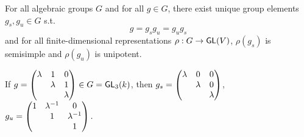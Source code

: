 \begin{theorem}[Goal]
For all algebraic groups $G$ and for all $g \in G$, there exist unique group elements $g_s, g_u \in G$ s.t.
\[g = g_s g_u = g_ug_s\]
and
for all finite-dimensional representations  $\rho : G \overset{}{\rightarrow} \textsf{GL}(V)$, $\rho(g_s)$ is semisimple and $\rho(g_u)$ is unipotent.
\end{theorem}

\begin{example}
If	$g = \left(\begin{matrix}
	\lambda & 1 & 0 \\
	& \lambda & 1 \\
	& & \lambda
	\end{matrix}\right) \in G = \textsf{GL}_3(k)$, then $g_s = \left(\begin{matrix}
	\lambda & 0 & 0 \\
	& \lambda & 0 \\
	& & \lambda
	\end{matrix}\right)$, $g_u = \left(\begin{matrix}
	1 & \lambda^{-1} & 0 \\
	& 1 & \lambda^{-1} \\
	& & 1
	\end{matrix}\right). $
\end{example}